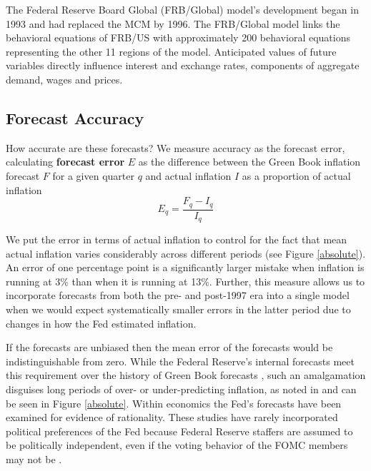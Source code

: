 \documentclass[a4paper]{article}\usepackage{graphicx, color}
\begin{document}
The Federal Reserve Board Global (FRB/Global) model's development began in 1993 and had replaced the MCM by 1996. The FRB/Global model links the behavioral equations of FRB/US with approximately 200 behavioral equations representing the other 11 regions of the model. Anticipated values of future variables directly influence interest and exchange rates, components of aggregate demand, wages and prices.

\subsection{Forecast Accuracy}\label{ForecastAcc}

How accurate are these forecasts? We measure accuracy as the forecast error,  calculating {\bf{forecast error}} $E$ as the difference between the Green Book inflation forecast $F$ for a given quarter $q$ and actual inflation $I$ as a proportion of actual inflation
%
\begin{equation}
    E_{q} = \frac{F_{q} - I_{q}}{I_{q}}
\end{equation}
%

We put the error in terms of actual inflation to control for the fact that mean actual inflation varies considerably across different periods (see Figure \ref{absolute}). An error of one percentage point is a significantly larger mistake when inflation is running at 3\% than when it is running at 13\%. Further, this measure allows us to incorporate forecasts from both the pre- and post-1997 era into a single model when we would expect systematically smaller errors in the latter period due to changes in how the Fed estimated inflation. 

If the forecasts are unbiased then the mean error of the forecasts would be indistinguishable from zero. While the Federal Reserve's internal forecasts meet this requirement over the history of Green Book forecasts \citep{Romer2000}, such an amalgamation disguises long periods of over- or under-predicting inflation, as noted in \cite{Capistran2006} and can be seen in Figure \ref{absolute}. Within economics the Fed's forecasts have been examined for evidence of rationality. These studies have rarely incorporated political preferences of the Fed because Federal Reserve staffers are assumed to be politically independent, even if the voting behavior of the FOMC members may not be \citep{Clark2011}.
\end{document}
